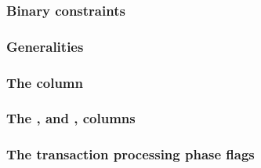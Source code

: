 \subsubsection{Binary constraints}                                                           \label{hub: system: fine structure: binarities}                      
\subsubsection{Generalities}                                                                 \label{hub: system: fine structure: generalities}                    
\subsubsection{The \hubStamp{} column}                                                       \label{hub: system: fine structure: hub stamp}                       
\subsubsection{The \tli, \tliCounter{} and \nonStackRows, \nonStackRowsCounter{} columns}    \label{hub: system: fine structure: counters}                        
\subsubsection{The transaction processing phase flags}                                       \label{hub: system: fine structure: transaction processing flags}    
